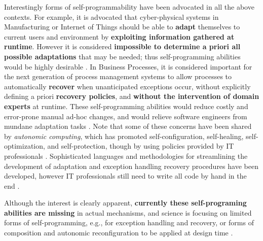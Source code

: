 Interestingly forms of self-programmability have been advocated in all
the above contexts.
For example, it is advocated that cyber-physical systems in
Manufacturing or Internet of Things should be able
to \textbf{adapt} themselves to current users and environment by
\textbf{exploiting information gathered at runtime}.  However it is
considered \textbf{impossible to determine a priori all possible adaptations}
that may be needed; thus self-programming abilities would be highly desirable
\cite{Seiger2016}.
In Business Processes, it is considered important for the next
generation of process management systems to allow processes to
automatically \textbf{recover} when unanticipated exceptions
occur, without explicitly defining a priori \textbf{recovery policies},
and \textbf{without the intervention of domain experts} at runtime. These
self-programming abilities would reduce costly and error-prone manual
ad-hoc changes, and would relieve software engineers from mundane
adaptation tasks \cite{MarrellaMS17}.
Note that some of these concerns have been shared by \emph{autonomic
  computing}, which has promoted self-configuration, self-healing,
self-optimization, and self-protection, though by using policies
provided by IT professionals \cite{ibm2005autonomic}. 
Sophisticated languages and
methodologies for streamlining 
the development of
adaptation and exception
handling recovery procedures have been developed, however  IT
professionals still need to write
all code by hand in the end \cite{Cerf15,MarronAEGKLMSSW16}.




Although the interest is clearly apparent, \textbf{currently these
self-programing abilities are missing} in actual mechanisms, and
science is focusing on limited forms of self-programming, e.g., for
exception handling and recovery, or forms of composition and 
autonomic reconfiguration to be applied at design time \cite{HarelKMM16}.


